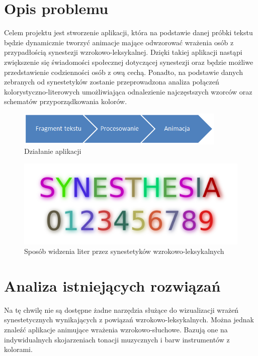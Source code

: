 \documentclass[12pt]{article}
\begin{document}
\section{Opis problemu}
	Celem projektu jest stworzenie aplikacji, która na podstawie danej próbki tekstu będzie dynamicznie tworzyć animacje mające odwzorować wrażenia osób z przypadłością synestezji wzrokowo-leksykalnej. Dzięki takiej aplikacji nastąpi zwiększenie się świadomości społecznej dotyczącej synestezji oraz będzie możliwe przedstawienie codzienności osób z ową cechą. Ponadto, na podstawie danych zebranych od synestetyków zostanie przeprowadzona analiza połączeń kolorystyczno-literowych umożliwiająca odnalezienie najczęstszych wzorców oraz schematów przyporządkowania kolorów.
\begin{figure}[ht!]
	\centering
	\includegraphics[width=10cm]{Capture.PNG}
	\caption{Działanie aplikacji}
\end{figure} 
\begin{figure}[H]
	\centering
	\includegraphics[width=\textwidth]{Synesthesia.png}
	\caption{Sposób widzenia liter przez synestetyków wzrokowo-leksykalnych}
\end{figure}
\pagebreak
\section{Analiza istniejących rozwiązań}
Na tę chwilę nie są dostępne żadne narzędzia służące do wizualizacji wrażeń synestetycznych wynikających z powiązań wzrokowo-leksykalnych. Można jednak znaleźć aplikacje animujące wrażenia wzrokowo-słuchowe. Bazują one na indywidualnych skojarzeniach tonacji muzycznych i barw instrumentów z kolorami. 
\end{document}
